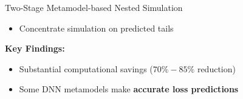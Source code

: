 \documentclass[9pt,handout]{beamer}
\begin{document}
\begin{frame}{Two-Stage Metamodel-based Nested Simulation}

\begin{algorithm}[H]
    \caption{Two-Stage Metamodel-based Nested Simulation for VAs}

\begin{algorithmic}[1]
    \begin{itemize}
        \item  Concentrate simulation on predicted tails
    \end{itemize}
\end{algorithmic}
\end{algorithm}

\vspace{10pt}

\textbf{Key Findings:}
\begin{itemize}
    \item   Substantial computational savings ($70\% - 85\%$ reduction)
    \item   Some DNN metamodels make \textbf{accurate loss predictions}
\end{itemize}


\end{frame}
\end{document}
